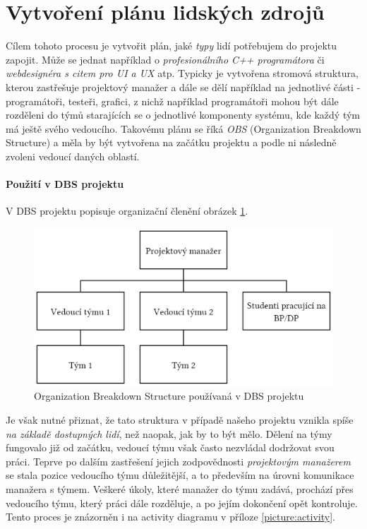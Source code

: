 
\section{Vytvoření plánu lidských zdrojů}

Cílem tohoto procesu je vytvořit plán, jaké \emph{typy} lidí potřebujem do projektu zapojit. Může se jednat například o \emph{profesionálního C++ programátora} či \emph{webdesignéra s citem pro UI a UX} atp. Typicky je vytvořena stromová struktura, kterou zastřešuje projektový manažer a dále se dělí například na jednotlivé části - programátoři, testeři, grafici, z nichž například programátoři mohou být dále rozděleni do týmů starajících se o jednotlivé komponenty systému, kde každý tým má ještě svého vedoucího. Takovému plánu se říká \emph{OBS} (Organization Breakdown Structure) a měla by být vytvořena na začátku projektu a podle ni následně zvoleni vedoucí daných oblastí.

\paragraph{Použití v DBS projektu}
V DBS projektu popisuje organizační členění obrázek \ref{picture:obs}.
\begin{figure}[h]
\includegraphics[width=\textwidth]{../pdf/dbs-obs.pdf}
\caption{Organization Breakdown Structure používaná v DBS projektu} \label{picture:obs}
\end{figure}
Je však nutné přiznat, že tato struktura v případě našeho projektu vznikla spíše \emph{na základě dostupných lidí}, než naopak, jak by to být mělo. Dělení na týmy fungovalo již od začátku, vedoucí týmu však často nezvládal dodržovat svou práci. Teprve po dalším zastřešení jejich zodpovědnosti \emph{projektovým manažerem} se stala pozice vedoucího týmu důležitější, a to především na úrovni komunikace manažera s týmem. Veškeré úkoly, které manažer do týmu zadává, prochází přes vedoucího týmu, který práci dále rozděluje, a po jejím dokončení opět kontroluje. Tento proces je znázorněn i na activity diagramu v příloze \ref{picture:activity}.

